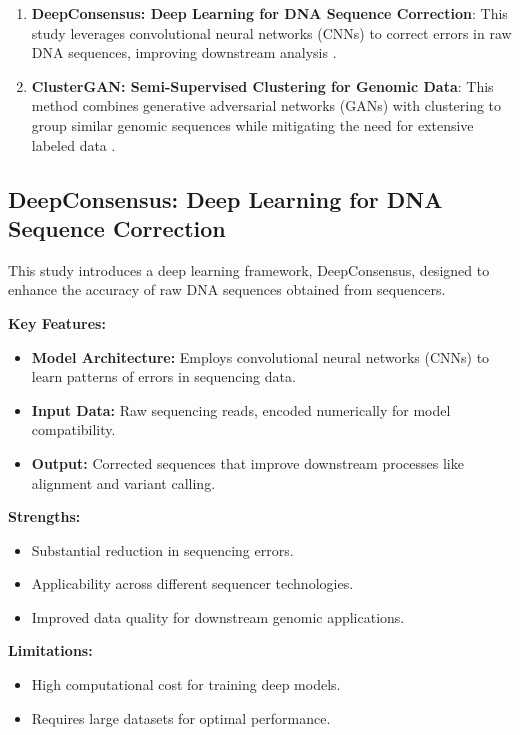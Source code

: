 \begin{enumerate}
    \item \textbf{DeepConsensus: Deep Learning for DNA Sequence Correction}: This study leverages convolutional neural networks (CNNs) to correct errors in raw DNA sequences, improving downstream analysis \cite{deepconsensus}.
    \item \textbf{ClusterGAN: Semi-Supervised Clustering for Genomic Data}: This method combines generative adversarial networks (GANs) with clustering to group similar genomic sequences while mitigating the need for extensive labeled data \cite{clustergan}.
\end{enumerate}

\subsection{DeepConsensus: Deep Learning for DNA Sequence Correction}

This study introduces a deep learning framework, DeepConsensus, designed to enhance the accuracy of raw DNA sequences obtained from sequencers.

\textbf{Key Features:}
\begin{itemize}
    \item \textbf{Model Architecture:} Employs convolutional neural networks (CNNs) to learn patterns of errors in sequencing data.
    \item \textbf{Input Data:} Raw sequencing reads, encoded numerically for model compatibility.
    \item \textbf{Output:} Corrected sequences that improve downstream processes like alignment and variant calling.
\end{itemize}

\textbf{Strengths:}
\begin{itemize}
    \item Substantial reduction in sequencing errors.
    \item Applicability across different sequencer technologies.
    \item Improved data quality for downstream genomic applications.
\end{itemize}

\textbf{Limitations:}
\begin{itemize}
    \item High computational cost for training deep models.
    \item Requires large datasets for optimal performance.
\end{itemize}

